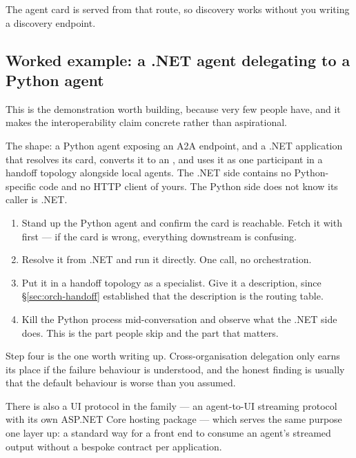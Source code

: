 The agent card is served from that route, so discovery works without you writing
a discovery endpoint.

\subsection{Worked example: a .NET agent delegating to a Python agent}

This is the demonstration worth building, because very few people have, and it
makes the interoperability claim concrete rather than aspirational.

The shape: a Python agent exposing an A2A endpoint, and a .NET application that
resolves its card, converts it to an , and uses it as one
participant in a handoff topology alongside local agents. The .NET side contains
no Python-specific code and no HTTP client of yours. The Python side does not
know its caller is .NET.

\begin{enumerate}[leftmargin=1.4em]
\item Stand up the Python agent and confirm the card is reachable. Fetch it with
       first --- if the card is wrong, everything downstream is
      confusing.
\item Resolve it from .NET and run it directly. One call, no orchestration.
\item Put it in a handoff topology as a specialist. Give it a description, since
      \S\ref{sec:orch-handoff} established that the description is the routing
      table.
\item Kill the Python process mid-conversation and observe what the .NET side
      does. This is the part people skip and the part that matters.
\end{enumerate}

\begin{note}
Step four is the one worth writing up. Cross-organisation delegation only earns
its place if the failure behaviour is understood, and the honest finding is
usually that the default behaviour is worse than you assumed.
\end{note}

There is also a UI protocol in the family --- an agent-to-UI streaming protocol
with its own ASP.NET Core hosting package --- which serves the same purpose one
layer up: a standard way for a front end to consume an agent's streamed output
without a bespoke contract per application.


